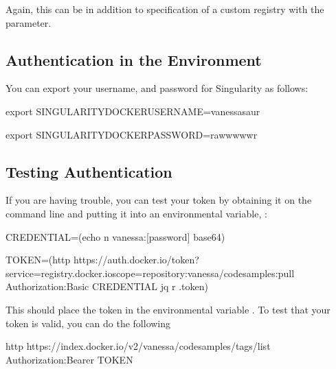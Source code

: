 \documentclass[letterpaper,10pt,english]{sphinxmanual}
\begin{document}
Again, this can be in addition to specification of a custom registry
with the  parameter.


\subsection{Authentication in the Environment}
\label{\detokenize{singularity_and_docker:authentication-in-the-environment}}
You can export your username, and password for Singularity as follows:

%
\begin{sphinxVerbatim}[commandchars=\\\{\}]
export SINGULARITY\PYGZus{}DOCKER\PYGZus{}USERNAME=vanessasaur

export SINGULARITY\PYGZus{}DOCKER\PYGZus{}PASSWORD=rawwwwwr
\end{sphinxVerbatim}


\subsection{Testing Authentication}
\label{\detokenize{singularity_and_docker:testing-authentication}}
If you are having trouble, you can test your token by obtaining it on
the command line and putting it into an environmental variable,  :

%
\begin{sphinxVerbatim}[commandchars=\\\{\}]
CREDENTIAL=\PYGZdl{}(echo \PYGZhy{}n vanessa:[password] \textbar{} base64)

TOKEN=\PYGZdl{}(http \PYGZsq{}https://auth.docker.io/token?service=registry.docker.io\PYGZam{}scope=repository:vanessa/code\PYGZhy{}samples:pull\PYGZsq{} Authorization:\PYGZdq{}Basic \PYGZdl{}CREDENTIAL\PYGZdq{} \textbar{} jq \PYGZhy{}r \PYGZsq{}.token\PYGZsq{})
\end{sphinxVerbatim}

This should place the token in the environmental variable  . To test that
your token is valid, you can do the following

%
\begin{sphinxVerbatim}[commandchars=\\\{\}]
http https://index.docker.io/v2/vanessa/code\PYGZhy{}samples/tags/list Authorization:\PYGZdq{}Bearer \PYGZdl{}TOKEN\PYGZdq{}
\end{sphinxVerbatim}
\end{document}
